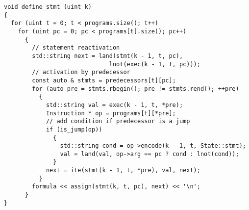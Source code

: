 



\begin{lstlisting}[style=c++]
void define_stmt (uint k)
{
  for (uint t = 0; t < programs.size(); t++)
    for (uint pc = 0; pc < programs[t].size(); pc++)
      {
        // statement reactivation
        std::string next = land(stmt(k - 1, t, pc),
                              lnot(exec(k - 1, t, pc)));
        // activation by predecessor
        const auto & stmts = predecessors[t][pc];
        for (auto pre = stmts.rbegin(); pre != stmts.rend(); ++pre)
          {
            std::string val = exec(k - 1, t, *pre);
            Instruction * op = programs[t][*pre];
            // add condition if predecessor is a jump
            if (is_jump(op))
              {
                std::string cond = op->encode(k - 1, t, State::stmt);
                val = land(val, op->arg == pc ? cond : lnot(cond));
              }
            next = ite(stmt(k - 1, t, *pre), val, next);
          }
        formula << assign(stmt(k, t, pc), next) << '\n';
      }
}
\end{lstlisting}

